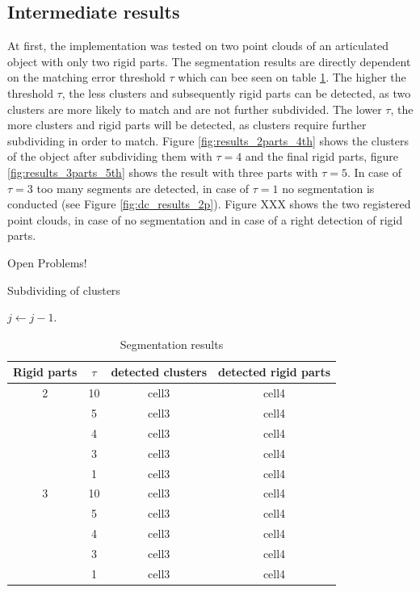 \documentclass[notitlepage,english]{report}
\begin{document}
\subsection{Intermediate results}

At first, the implementation was tested on two point clouds of an articulated object with only two rigid parts. The segmentation results are directly dependent on the matching error threshold $\tau$ which can bee seen on table \ref{table:segmentation_results}. The higher the threshold $\tau$, the less clusters and subsequently rigid parts can be detected, as two clusters are more likely to match and are not further subdivided. The lower $\tau$, the more clusters and rigid parts will be detected, as clusters require further subdividing in order to match. Figure \ref{fig:results_2parts_4th} shows the clusters of the object after subdividing them with $\tau = 4$ and the final rigid parts, figure \ref{fig:results_3parts_5th} shows the result with three parts with $\tau = 5$. In case of $\tau = 3$ too many segments are detected, in case of $\tau = 1$ no segmentation is conducted (see Figure \ref{fig:dc_results_2p}). Figure XXX shows the two registered point clouds, in case of no segmentation and in case of a right detection of rigid parts.

Open Problems!

\begin{algorithm}
	\caption{Subdividing of clusters}\label{subdividing}
	\begin{algorithmic}[1]
				\State $j \gets j-1$.
		\EndProcedure
	\end{algorithmic}
\end{algorithm}

\begin{table}
	\centering\small
	\begin{tabular}{ |c|c|c|c| } 
		\hline
		Rigid parts & $\tau$ & detected clusters & detected rigid parts \\
		\hline
		2 & 10 & cell3 & cell4 \\ 
		 & 5 & cell3 & cell4 \\
		 & 4 & cell3 & cell4 \\
		 & 3 & cell3 & cell4 \\
		 & 1 & cell3 & cell4 \\
		 \hline
		3 & 10 & cell3 & cell4 \\ 
		 & 5 & cell3 & cell4 \\
		 & 4 & cell3 & cell4 \\
		 & 3 & cell3 & cell4 \\
		 & 1 & cell3 & cell4 \\
		\hline
	\end{tabular}
	\caption{Segmentation results}
	\label{table:segmentation_results}
\end{table}
\end{document}
